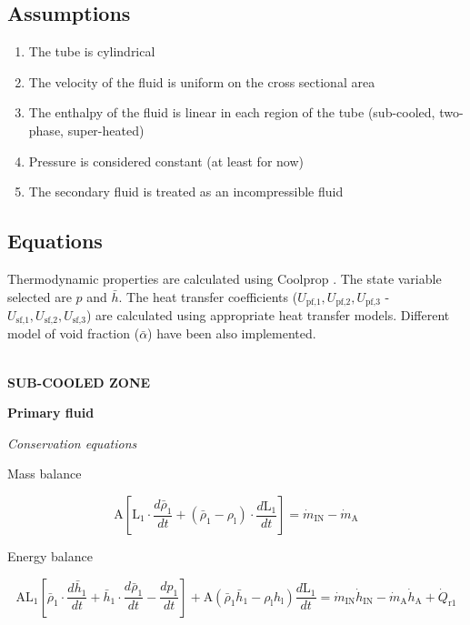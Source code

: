 \documentclass[11pt]{article} %
\begin{document}
\subsection{Assumptions}
\begin{enumerate}
\renewcommand{\theenumi}{\roman{enumi}}
\item The tube is cylindrical
\item The velocity of the fluid is uniform on the cross sectional area
\item The enthalpy of the fluid is linear in each region of the tube (sub-cooled, two-phase, super-heated)
\item Pressure is considered constant (at least for now)
\item The secondary fluid is treated as an incompressible fluid
\end{enumerate}
\subsection{Equations}
Thermodynamic properties are calculated using Coolprop \cite{Bell2013}. The state variable selected are $p$ and $\bar{h}$. The heat transfer coefficients ($U_\text{pf,1},U_\text{pf,2},U_\text{pf,3}$ - $U_\text{sf,1},U_\text{sf,2},U_\text{sf,3}$) are calculated using appropriate heat transfer models. Different model of void fraction ($\bar{\alpha}$) have been also implemented.\\
\\
\begin{center}
{\bf SUB-COOLED ZONE}
\end{center}
{\bf Primary fluid} 
\begin{center}
\textit{Conservation equations}\\
\end{center}


\begin{flushleft}
Mass balance\\
\end{flushleft}
\begin{equation}
\text{A} [\text{L}_\text{1}  \cdot \frac{d \bar{\rho}_\text{1}}{d t} + (\bar{\rho}_\text{1} - \rho_\text{l}) \cdot \frac{d \text{L}_\text{1}}{d t}] = \dot{m}_\text{IN} -  \dot{m}_\text{A}
\end{equation}

\begin{flushleft}
Energy balance\\
\end{flushleft}
\begin{equation}
\text{A}\text{L}_\text{1}[\bar{\rho}_\text{1} \cdot \frac{d \bar{h}_\text{1}}{d t} + \bar{h}_\text{1} \cdot \frac{d \bar{\rho}_\text{1}}{d t}  -  \frac{d p_\text{1}}{d t}] + \text{A}(\bar{\rho}_\text{1}\bar{h}_\text{1} - \rho_\text{l}h_\text{l})\frac{d \text{L}_\text{1}}{d t} = \dot{m}_\text{IN}  \dot{h}_\text{IN} -  \dot{m}_\text{A} \dot{h}_\text{A} + \dot{Q}_\text{r1}
\end{equation}
\end{document}
